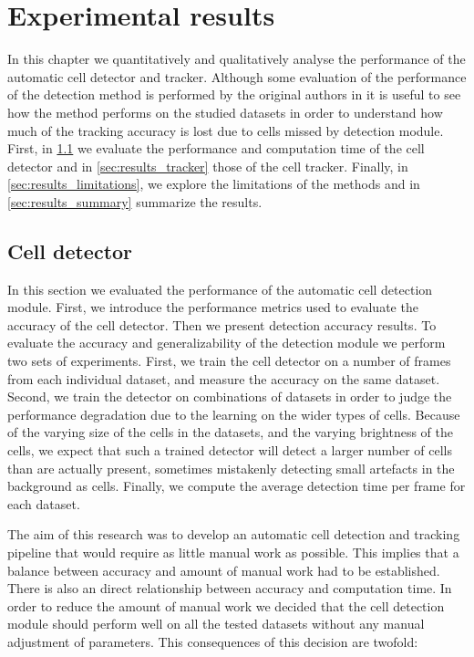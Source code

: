 \chapter{Experimental results }
\label{chap:results}

In this chapter we quantitatively and qualitatively analyse the performance of the automatic cell detector and tracker. Although some evaluation of the performance of the detection method is performed by the original authors in \cite{arteta12} it is useful to see how the method performs on the studied datasets in order to understand how much of the tracking accuracy is lost due to cells missed by detection module. First, in \cref{sec:results_detector} we evaluate the performance and computation time of the cell detector and in \cref{sec:results_tracker} those of the cell tracker. Finally, in \cref{sec:results_limitations}, we explore the limitations of the methods and in \cref{sec:results_summary} summarize the results.


\section{Cell detector }
	\label{sec:results_detector}
	
	In this section we evaluated the performance of the automatic cell detection module. First, we introduce the performance metrics used to evaluate the accuracy of the cell detector. Then we present detection accuracy results. To evaluate the accuracy and generalizability of the detection module we perform two sets of experiments. First, we train the cell detector on a number of frames from each individual dataset, and measure the accuracy on the same dataset. Second, we train the detector on combinations of datasets in order to judge the performance degradation due to the learning on the wider types of cells. Because of the varying size of the cells in the datasets, and the varying brightness of the cells, we expect that such a trained detector will detect a larger number of cells than are actually present, sometimes mistakenly detecting small artefacts in the background as cells. Finally, we compute the average detection time per frame for each dataset.
	
	The aim of this research was to develop an automatic cell detection and tracking pipeline that would require as little manual work as possible. This implies that a balance between accuracy and amount of manual work had to be established. There is also an direct relationship between accuracy and computation time. In order to reduce the amount of manual work we decided that the cell detection module should perform well on all the tested datasets without any manual adjustment of parameters. This consequences of this decision are twofold:
	
